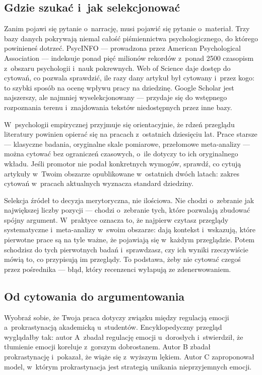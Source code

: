 \documentclass[12pt,a4paper,twoside,openany]{book}
\begin{document}
\subsection{Gdzie szukać i~jak selekcjonować}

Zanim pojawi się pytanie o~narrację, musi pojawić się pytanie o~materiał. Trzy bazy danych pokrywają niemal całość piśmiennictwa psychologicznego, do którego powinieneś dotrzeć. PsycINFO --- prowadzona przez American Psychological Association --- indeksuje ponad pięć milionów rekordów z~ponad 2500 czasopism z~obszaru psychologii i~nauk pokrewnych. Web of Science daje dostęp do cytowań, co pozwala sprawdzić, ile razy dany artykuł był cytowany i~przez kogo: to szybki sposób na ocenę wpływu pracy na dziedzinę. Google Scholar jest najszerszy, ale najmniej wyselekcjonowany --- przydaje się do wstępnego rozpoznania terenu i~znajdowania tekstów niedostępnych przez inne bazy.

\begin{tipbox}
W~psychologii empirycznej przyjmuje się orientacyjnie, że rdzeń przeglądu literatury powinien opierać się na pracach z~ostatnich dziesięciu lat. Prace starsze --- klasyczne badania, oryginalne skale pomiarowe, przełomowe meta-analizy --- można cytować bez ograniczeń czasowych, o~ile dotyczy to ich oryginalnego wkładu. Jeśli promotor nie podał konkretnych wymogów, sprawdź, co cytują artykuły w~Twoim obszarze opublikowane w~ostatnich dwóch latach: zakres cytowań w~pracach aktualnych wyznacza standard dziedziny.
\end{tipbox}

Selekcja źródeł to decyzja merytoryczna, nie ilościowa. Nie chodzi o~zebranie jak największej liczby pozycji --- chodzi o~zebranie tych, które pozwalają zbudować spójny argument. W~praktyce oznacza to, że najpierw czytasz przeglądy systematyczne i~meta-analizy w~swoim obszarze: dają kontekst i~wskazują, które pierwotne prace są na tyle ważne, że pojawiają się w~każdym przeglądzie. Potem schodzisz do tych pierwotnych badań i~sprawdzasz, czy ich wyniki rzeczywiście mówią to, co przypisują im przeglądy. To podstawa, żeby nie cytować czegoś przez pośrednika --- błąd, który recenzenci wyłapują ze zdenerwowaniem.

\subsection{Od cytowania do argumentowania}

Wyobraź sobie, że Twoja praca dotyczy związku między regulacją emocji a~prokrastynacją akademicką u~studentów. Encyklopedyczny przegląd wyglądałby tak: autor A~zbadał regulację emocji u~dorosłych i~stwierdził, że tłumienie emocji koreluje z~gorszym dobrostanem. Autor B zbadał prokrastynację i~pokazał, że wiąże się z~wyższym lękiem. Autor C zaproponował model, w~którym prokrastynacja jest strategią unikania nieprzyjemnych emocji.
\end{document}
